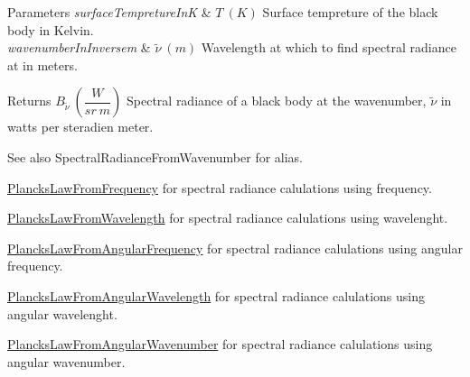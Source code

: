 \begin{DoxyParams}{Parameters}
{\em surface\+Tempreture\+InK} & $T\ (K)$ Surface tempreture of the black body in Kelvin. \\
\hline
{\em wavenumber\+In\+Inversem} & $\tilde {\nu }\ (m)$ Wavelength at which to find spectral radiance at in meters. \\
\hline
\end{DoxyParams}
\begin{DoxyReturn}{Returns}
$B_{\tilde {\nu }}\ ( \dfrac{W}{sr\ m})$ Spectral radiance of a black body at the wavenumber, $\tilde {\nu }$ in watts per steradien meter. 
\end{DoxyReturn}
\begin{DoxySeeAlso}{See also}
Spectral\+Radiance\+From\+Wavenumber for alias. 

\mbox{\hyperlink{group___e_g_x_phys-_electrodynamics-_black_body-_plancks_law_ga68aae82f8a086831358c4a61c8c80ba4}{Plancks\+Law\+From\+Frequency}} for spectral radiance calulations using frequency. 

\mbox{\hyperlink{group___e_g_x_phys-_electrodynamics-_black_body-_plancks_law_ga54639bc031ded51ef78aa82b0457a4dd}{Plancks\+Law\+From\+Wavelength}} for spectral radiance calulations using wavelenght. 

\mbox{\hyperlink{group___e_g_x_phys-_electrodynamics-_black_body-_plancks_law_gaac540560c71e30c02b91d22e417b5863}{Plancks\+Law\+From\+Angular\+Frequency}} for spectral radiance calulations using angular frequency. 

\mbox{\hyperlink{group___e_g_x_phys-_electrodynamics-_black_body-_plancks_law_ga7322124727f968d28807e918c5eeb23f}{Plancks\+Law\+From\+Angular\+Wavelength}} for spectral radiance calulations using angular wavelenght. 

\mbox{\hyperlink{group___e_g_x_phys-_electrodynamics-_black_body-_plancks_law_gaa3d3e0fdb77d25bdd40523f9975de902}{Plancks\+Law\+From\+Angular\+Wavenumber}} for spectral radiance calulations using angular wavenumber. 
\end{DoxySeeAlso}
